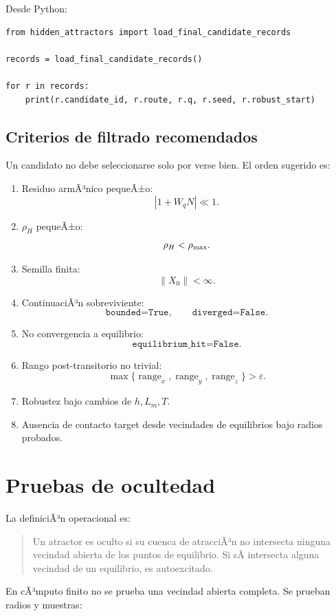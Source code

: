 \documentclass[11pt]{article}
\begin{document}
Desde Python:

\begin{lstlisting}
from hidden_attractors import load_final_candidate_records

records = load_final_candidate_records()

for r in records:
    print(r.candidate_id, r.route, r.q, r.seed, r.robust_start)
\end{lstlisting}

\subsection{Criterios de filtrado recomendados}

Un candidato no debe seleccionarse solo por verse bien. El orden sugerido es:

\begin{enumerate}
\item Residuo armÃ³nico pequeÃ±o:
\[
|1+W_qN|\ll 1.
\]
\item \(\rho_H\) pequeÃ±o:
\[
\rho_H<\rho_{\rm max}.
\]
\item Semilla finita:
\[
\|X_0\|<\infty.
\]
\item ContinuaciÃ³n sobreviviente:
\[
\texttt{bounded=True},\qquad \texttt{diverged=False}.
\]
\item No convergencia a equilibrio:
\[
\texttt{equilibrium\_hit=False}.
\]
\item Rango post-transitorio no trivial:
\[
\max\{\operatorname{range}_x,\operatorname{range}_y,\operatorname{range}_z\}>\varepsilon.
\]
\item Robustez bajo cambios de \(h,L_m,T\).
\item Ausencia de contacto target desde vecindades de equilibrios bajo radios probados.
\end{enumerate}

\section{Pruebas de ocultedad}

La definiciÃ³n operacional es:

\begin{quote}
Un atractor es oculto si su cuenca de atracciÃ³n no intersecta ninguna vecindad abierta de los puntos de equilibrio. Si sÃ­ intersecta alguna vecindad de un equilibrio, es autoexcitado.
\end{quote}

En cÃ³mputo finito no se prueba una vecindad abierta completa. Se prueban radios y muestras:
\end{document}
